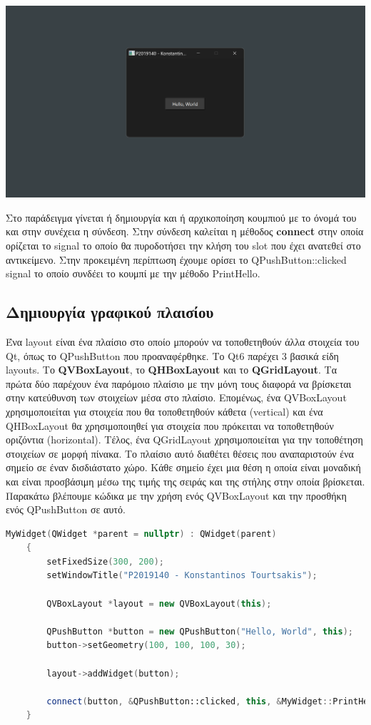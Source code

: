\includegraphics[width=1.0\textwidth]{./images/QPushButton.png}

Στο παράδειγμα γίνεται ή δημιουργία και ή αρχικοποίηση κουμπιού με το όνομά του και στην συνέχεια η σύνδεση.
Στην σύνδεση καλείται η μέθοδος \textbf{connect} στην οποία ορίζεται το signal το οποίο
θα πυροδοτήσει την κλήση του slot που έχει ανατεθεί στο αντικείμενο. Στην προκειμένη περίπτωση έχουμε
ορίσει το QPushButton::clicked signal το οποίο συνδέει το κουμπί με την μέθοδο PrintHello.

\subsection{Δημιουργία γραφικού πλαισίου}
Ένα layout είναι ένα πλαίσιο στο οποίο μπορούν να τοποθετηθούν άλλα στοιχεία του Qt, όπως
το QPushButton που προαναφέρθηκε. Το Qt6 παρέχει 3 βασικά είδη layouts. Το \textbf{QVBoxLayout}, το
\textbf{QHBoxLayout} και το \textbf{QGridLayout}. Τα πρώτα δύο παρέχουν ένα παρόμοιο πλαίσιο με την μόνη
τους διαφορά να βρίσκεται στην κατεύθυνση των στοιχείων μέσα στο πλαίσιο. Επομένως, ένα
QVBoxLayout χρησιμοποιείται για στοιχεία που θα τοποθετηθούν κάθετα (vertical) και ένα
QHBoxLayout θα χρησιμοποιηθεί για στοιχεία που πρόκειται να τοποθετηθούν οριζόντια (horizontal).
Τέλος, ένα QGridLayout χρησιμοποιείται για την τοποθέτηση στοιχείων σε μορφή πίνακα. Το
πλαίσιο αυτό διαθέτει θέσεις που αναπαριστούν ένα σημείο σε έναν δισδιάστατο χώρο. Κάθε σημείο
έχει μια θέση η οποία είναι μοναδική και είναι προσβάσιμη μέσω της τιμής της σειράς και της
στήλης στην οποία βρίσκεται. Παρακάτω βλέπουμε κώδικα με την χρήση ενός QVBoxLayout και την
προσθήκη ενός QPushButton σε αυτό.
\begin{lstlisting}[language=C++, style=cppstyle]
	MyWidget(QWidget *parent = nullptr) : QWidget(parent) 
    {
        setFixedSize(300, 200);
        setWindowTitle("P2019140 - Konstantinos Tourtsakis");
        
        QVBoxLayout *layout = new QVBoxLayout(this);

        QPushButton *button = new QPushButton("Hello, World", this);
        button->setGeometry(100, 100, 100, 30);

        layout->addWidget(button);

        connect(button, &QPushButton::clicked, this, &MyWidget::PrintHello);
    }

\end{lstlisting}

